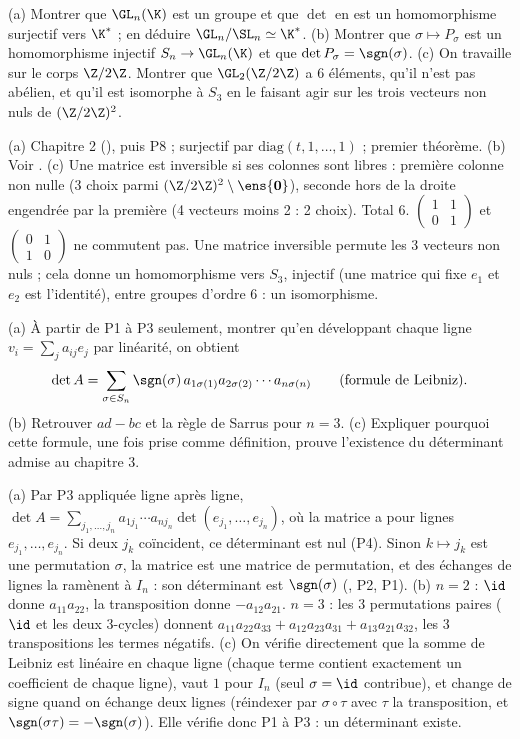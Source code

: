 \begin{exo}[S][Le fil de $\GL_n$]
(a) Montrer que $\GL_n(\K)$ est un groupe et que $\det$ en est un homomorphisme surjectif vers $\K^*$ ; en déduire $\GL_n/\SL_n\simeq\K^*$. (b) Montrer que $\sigma\mapsto P_\sigma$ est un homomorphisme injectif $S_n\to\GL_n(\K)$ et que $\det P_\sigma=\sgn(\sigma)$. (c) On travaille sur le corps $\Z/2\Z$. Montrer que $\GL_2(\Z/2\Z)$ a 6 éléments, qu'il n'est pas abélien, et qu'il est isomorphe à $S_3$ en le faisant agir sur les trois vecteurs non nuls de $(\Z/2\Z)^2$.
\begin{corrige}
(a) Chapitre 2 (), puis P8 ; surjectif par $\mathrm{diag}(t,1,\dots,1)$ ; premier théorème. (b) Voir . (c) Une matrice est inversible si ses colonnes sont libres : première colonne non nulle (3 choix parmi $(\Z/2\Z)^2\setminus\ens{\mathbf 0}$), seconde hors de la droite engendrée par la première (4 vecteurs moins 2 : 2 choix). Total $6$. $\begin{pmatrix}1&1\\0&1\end{pmatrix}$ et $\begin{pmatrix}0&1\\1&0\end{pmatrix}$ ne commutent pas. Une matrice inversible permute les 3 vecteurs non nuls ; cela donne un homomorphisme vers $S_3$, injectif (une matrice qui fixe $e_1$ et $e_2$ est l'identité), entre groupes d'ordre 6 : un isomorphisme.
\end{corrige}
\end{exo}
\begin{exo}
(a) À partir de P1 à P3 seulement, montrer qu'en développant chaque ligne $v_i=\sum_ja_{ij}e_j$ par linéarité, on obtient
\[\det A=\sum_{\sigma\in S_n}\sgn(\sigma)\,a_{1\sigma(1)}a_{2\sigma(2)}\cdots a_{n\sigma(n)}\qquad\text{(formule de Leibniz).}\]
(b) Retrouver $ad-bc$ et la règle de Sarrus pour $n=3$. (c) Expliquer pourquoi cette formule, une fois prise comme définition, prouve l'existence du déterminant admise au chapitre 3.
\begin{corrige}
(a) Par P3 appliquée ligne après ligne, $\det A=\sum_{j_1,\dots,j_n}a_{1j_1}\cdots a_{nj_n}\det(e_{j_1},\dots,e_{j_n})$, où la matrice a pour lignes $e_{j_1},\dots,e_{j_n}$. Si deux $j_k$ coïncident, ce déterminant est nul (P4). Sinon $k\mapsto j_k$ est une permutation $\sigma$, la matrice est une matrice de permutation, et des échanges de lignes la ramènent à $I_n$ : son déterminant est $\sgn(\sigma)$ (, P2, P1).
(b) $n=2$ : $\id$ donne $a_{11}a_{22}$, la transposition donne $-a_{12}a_{21}$. $n=3$ : les 3 permutations paires ($\id$ et les deux 3-cycles) donnent $a_{11}a_{22}a_{33}+a_{12}a_{23}a_{31}+a_{13}a_{21}a_{32}$, les 3 transpositions les termes négatifs.
(c) On vérifie directement que la somme de Leibniz est linéaire en chaque ligne (chaque terme contient exactement un coefficient de chaque ligne), vaut $1$ pour $I_n$ (seul $\sigma=\id$ contribue), et change de signe quand on échange deux lignes (réindexer par $\sigma\circ\tau$ avec $\tau$ la transposition, et $\sgn(\sigma\tau)=-\sgn(\sigma)$). Elle vérifie donc P1 à P3 : un déterminant existe.
\end{corrige}
\end{exo}
